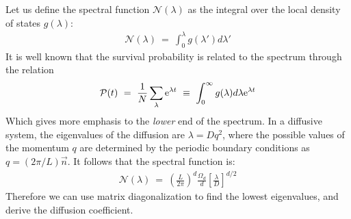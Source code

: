 Let us define the spectral function $\mathcal{N}(\lambda)$ as
the integral over the local density of states $g(\lambda)$:
%
\begin{align}
\mathcal{N}(\lambda)\ =\ \int_0^\lambda g(\lambda')d\lambda'
\end{align}
%
It is well known that the survival probability is related to the spectrum through the relation
%
\begin{align}
\mathcal{P}(t)\ =\ \frac{1}{N}\sum_\lambda \eexp{\lambda t} \ \equiv \ \int_0^\infty g(\lambda)d\lambda  \eexp{\lambda t}
\end{align}
%
Which gives more emphasis to the \emph{lower} end of the spectrum.
In a diffusive system, the eigenvalues of the diffusion are $\lambda=Dq^2$, where the possible values of the momentum $q$ are determined by the periodic boundary conditions as $q=(2\pi/L)\vec{n}$. It follows that the spectral function is:
\begin{align}
\mathcal{N}(\lambda)\ =\ \left(\frac{L}{2\pi}\right)^d \frac{\Omega_d}{d} \left[\frac{\lambda}{D}\right]^{d/2}
\end{align}
%
Therefore we can use matrix diagonalization to find the lowest
eigenvalues, and derive the diffusion coefficient.


















